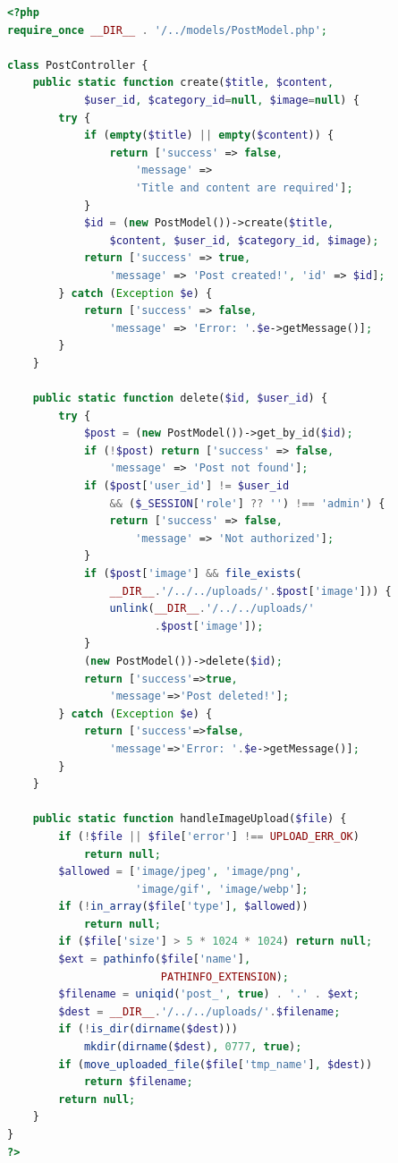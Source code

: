 \documentclass[12pt,a4paper]{report}
\begin{document}
\begin{lstlisting}[language=PHP]
<?php
require_once __DIR__ . '/../models/PostModel.php';

class PostController {
    public static function create($title, $content,
            $user_id, $category_id=null, $image=null) {
        try {
            if (empty($title) || empty($content)) {
                return ['success' => false,
                    'message' =>
                    'Title and content are required'];
            }
            $id = (new PostModel())->create($title,
                $content, $user_id, $category_id, $image);
            return ['success' => true,
                'message' => 'Post created!', 'id' => $id];
        } catch (Exception $e) {
            return ['success' => false,
                'message' => 'Error: '.$e->getMessage()];
        }
    }

    public static function delete($id, $user_id) {
        try {
            $post = (new PostModel())->get_by_id($id);
            if (!$post) return ['success' => false,
                'message' => 'Post not found'];
            if ($post['user_id'] != $user_id
                && ($_SESSION['role'] ?? '') !== 'admin') {
                return ['success' => false,
                    'message' => 'Not authorized'];
            }
            if ($post['image'] && file_exists(
                __DIR__.'/../../uploads/'.$post['image'])) {
                unlink(__DIR__.'/../../uploads/'
                       .$post['image']);
            }
            (new PostModel())->delete($id);
            return ['success'=>true,
                'message'=>'Post deleted!'];
        } catch (Exception $e) {
            return ['success'=>false,
                'message'=>'Error: '.$e->getMessage()];
        }
    }

    public static function handleImageUpload($file) {
        if (!$file || $file['error'] !== UPLOAD_ERR_OK)
            return null;
        $allowed = ['image/jpeg', 'image/png',
                    'image/gif', 'image/webp'];
        if (!in_array($file['type'], $allowed))
            return null;
        if ($file['size'] > 5 * 1024 * 1024) return null;
        $ext = pathinfo($file['name'],
                        PATHINFO_EXTENSION);
        $filename = uniqid('post_', true) . '.' . $ext;
        $dest = __DIR__.'/../../uploads/'.$filename;
        if (!is_dir(dirname($dest)))
            mkdir(dirname($dest), 0777, true);
        if (move_uploaded_file($file['tmp_name'], $dest))
            return $filename;
        return null;
    }
}
?>
\end{lstlisting}
\end{document}
